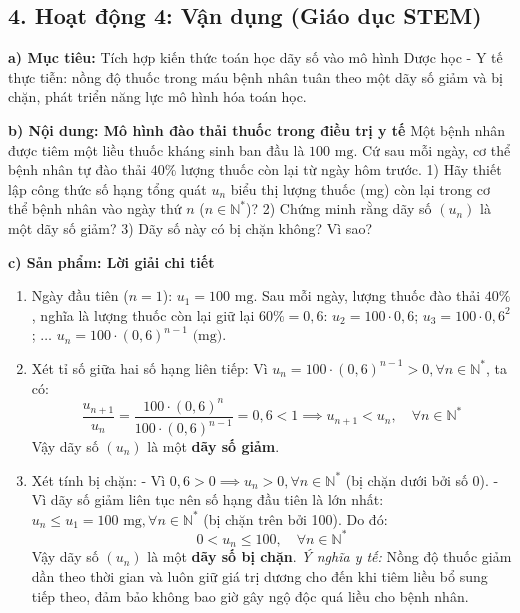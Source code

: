 \documentclass[12pt, a4paper]{article}
\begin{document}
\subsection*{4. Hoạt động 4: Vận dụng (Giáo dục STEM)}  
  
\noindent \textbf{a) Mục tiêu:}  
Tích hợp kiến thức toán học dãy số vào mô hình Dược học - Y tế thực tiễn: nồng độ thuốc trong máu bệnh nhân tuân theo một dãy số giảm và bị chặn, phát triển năng lực mô hình hóa toán học.  
  
\noindent \textbf{b) Nội dung: Mô hình đào thải thuốc trong điều trị y tế}  
Một bệnh nhân được tiêm một liều thuốc kháng sinh ban đầu là $100\text{ mg}$. Cứ sau mỗi ngày, cơ thể bệnh nhân tự đào thải $40\%$ lượng thuốc còn lại từ ngày hôm trước.  
1) Hãy thiết lập công thức số hạng tổng quát $u_n$ biểu thị lượng thuốc (mg) còn lại trong cơ thể bệnh nhân vào ngày thứ $n$ ($n \in \mathbb{N}^*$)?  
2) Chứng minh rằng dãy số $(u_n)$ là một dãy số giảm?  
3) Dãy số này có bị chặn không? Vì sao?  
  
\noindent \textbf{c) Sản phẩm: Lời giải chi tiết}  
\begin{enumerate}[leftmargin=0.6cm]  
    \item Ngày đầu tiên ($n = 1$): $u_1 = 100\text{ mg}$.  
    Sau mỗi ngày, lượng thuốc đào thải $40\%$, nghĩa là lượng thuốc còn lại giữ lại $60\% = 0{,}6$:  
    $u_2 = 100 \cdot 0{,}6$; \quad $u_3 = 100 \cdot 0{,}6^2$; \quad $\dots$ \quad $u_n = 100 \cdot (0{,}6)^{n-1}\text{ (mg)}$.  
    \item Xét tỉ số giữa hai số hạng liên tiếp:  
    Vì $u_n = 100 \cdot (0{,}6)^{n-1} > 0, \forall n \in \mathbb{N}^*$, ta có:  
    $$\dfrac{u_{n+1}}{u_n} = \dfrac{100 \cdot (0{,}6)^n}{100 \cdot (0{,}6)^{n-1}} = 0{,}6 < 1 \implies u_{n+1} < u_n, \quad \forall n \in \mathbb{N}^*$$  
    Vậy dãy số $(u_n)$ là một \textbf{dãy số giảm}.  
    \item Xét tính bị chặn:  
    - Vì $0{,}6 > 0 \implies u_n > 0, \forall n \in \mathbb{N}^*$ (bị chặn dưới bởi số 0).  
    - Vì dãy số giảm liên tục nên số hạng đầu tiên là lớn nhất: $u_n \le u_1 = 100\text{ mg}, \forall n \in \mathbb{N}^*$ (bị chặn trên bởi 100).  
    Do đó:  
    $$0 < u_n \le 100, \quad \forall n \in \mathbb{N}^*$$  
    Vậy dãy số $(u_n)$ là một \textbf{dãy số bị chặn}.  
    \textit{Ý nghĩa y tế:} Nồng độ thuốc giảm dần theo thời gian và luôn giữ giá trị dương cho đến khi tiêm liều bổ sung tiếp theo, đảm bảo không bao giờ gây ngộ độc quá liều cho bệnh nhân.  
\end{enumerate}  
  
\end{document}
